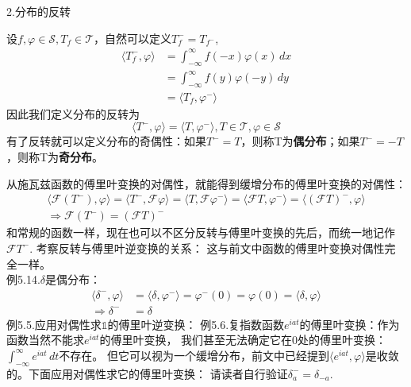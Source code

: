 \documentclass{ctexbook}
\begin{document}
\noindent 2.分布的反转

设$f,\varphi\in\mathcal{S} ,T_f\in\mathcal{T} $，自然可以定义$T_f^-=T_{f^-}$,
\begin{align*}
    \langle T_f^-,\varphi\rangle & =\int_{-\infty}^{\infty}f(-x)\varphi(x)\,dx \\
                                 & =\int_{-\infty}^{\infty}f(y)\varphi(-y)\,dy \\
                                 & =\langle T_f,\varphi^-\rangle
\end{align*}
因此我们定义分布的反转为
\begin{equation}
    \langle T^-,\varphi\rangle=\langle T,\varphi^-\rangle,T\in\mathcal{T} ,\varphi\in\mathcal{S}
\end{equation}
有了反转就可以定义分布的奇偶性：如果$T^-=T$，则称T为\textbf{偶分布}；如果$T^-=-T$
，则称T为\textbf{奇分布}。

从施瓦兹函数的傅里叶变换的对偶性，就能得到缓增分布的傅里叶变换的对偶性：
\begin{align*}
    \langle\mathcal{F}(T^-),\varphi\rangle=\langle T^-,\mathcal{F}\varphi\rangle=\langle T,\mathcal{F} \varphi^-\rangle=\langle\mathcal{F}T,\varphi^-\rangle=\langle(\mathcal{F}T)^-,\varphi\rangle \\
    \Rightarrow\mathcal{F}(T^-)= (\mathcal{F}T)^-
\end{align*}
和常规的函数一样，现在也可以不区分反转与傅里叶变换的先后，而统一地记作$\mathcal{F} T^-$.
考察反转与傅里叶逆变换的关系：
这与前文中函数的傅里叶变换对偶性完全一样。\\
例5.14.$\delta$是偶分布：
\begin{align*}
    \langle \delta^-,\varphi\rangle & =\langle \delta,\varphi^-\rangle=\varphi^-(0)=\varphi(0)=\langle \delta,\varphi\rangle \\
    \Rightarrow \delta^-            & =\delta
\end{align*}
例5.5.应用对偶性求$\mathds{1}$的傅里叶逆变换：
\noindent 例5.6.复指数函数$e^{iat}$的傅里叶变换：作为函数当然不能求$e^{iat}$的傅里叶变换，
我们甚至无法确定它在0处的傅里叶变换：$\int_{-\infty}^{\infty}e^{iat}\,dt$不存在。
但它可以视为一个缓增分布，前文中已经提到$\langle e^{iat},\varphi\rangle$是收敛
的。下面应用对偶性求它的傅里叶变换：
请读者自行验证$\delta_{a}^-= \delta_{-a}$.
\end{document}
